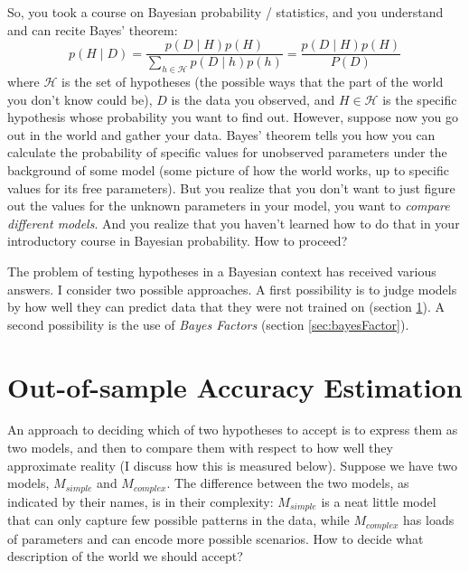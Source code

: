 \documentclass[a4paper,12pt,twoside]{article}
\begin{document}
So, you took a course on Bayesian probability / statistics, and you understand and can recite Bayes' theorem:
\begin{equation}
p(H \mid D) 
= \frac{p(D \mid H) p(H)}{\sum_{h \in \mathcal{H}} p(D \mid h) p(h)} 
= \frac{p(D \mid H) p(H)}{P(D)}
\end{equation}
\noindent where $\mathcal{H}$ is the set of hypotheses (the possible ways that the part of the world you don't know could be), $D$ is the data you observed, and $H \in \mathcal{H}$ is the specific hypothesis whose probability you want to find out. However, suppose now you go out in the world and gather your data. Bayes' theorem tells you how you can calculate the probability of specific values for unobserved parameters under the background of some model (some picture of how the world works, up to specific values for its free parameters). But you realize that you don't want to just figure out the values for the unknown parameters in your model, you want to \textit{compare different models}. And you realize that you haven't learned how to do that in your introductory course in Bayesian probability. How to proceed? 

The problem of testing hypotheses in a Bayesian context has received various answers. I consider two possible approaches. A first possibility is to judge models by how well they can predict data that they were not trained on (section \ref{sec:accuracyEstimation}). A second possibility is the use of \textit{Bayes Factors} (section \ref{sec:bayesFactor}).

\section{Out-of-sample Accuracy Estimation}\label{sec:accuracyEstimation}

An approach to deciding which of two hypotheses to accept is to express them as two models, and then to compare them with respect to how well they approximate reality (I discuss how this is measured below). Suppose we have two models, $M_{simple}$ and $M_{complex}$. The difference between the two models, as indicated by their names, is in their complexity: $M_{simple}$ is a neat little model that can only capture few possible patterns in the data, while $M_{complex}$ has loads of parameters and can encode more possible scenarios. How to decide what description of the world we should accept?
\end{document}
